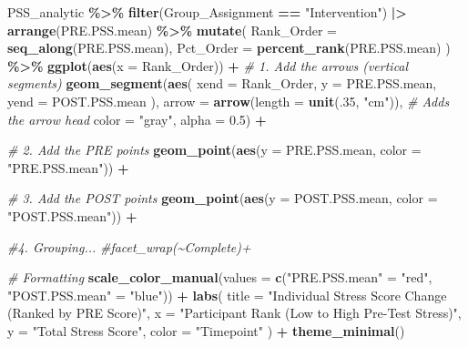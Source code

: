 \documentclass[
]{article}
\newenvironment{Shaded}{\begin{snugshade}}{\end{snugshade}}
\newcommand{\AttributeTok}[1]{\textcolor[rgb]{0.13,0.29,0.53}{#1}}
\newcommand{\CommentTok}[1]{\textcolor[rgb]{0.56,0.35,0.01}{\textit{#1}}}
\newcommand{\DecValTok}[1]{\textcolor[rgb]{0.00,0.00,0.81}{#1}}
\newcommand{\FloatTok}[1]{\textcolor[rgb]{0.00,0.00,0.81}{#1}}
\newcommand{\FunctionTok}[1]{\textcolor[rgb]{0.13,0.29,0.53}{\textbf{#1}}}
\newcommand{\NormalTok}[1]{#1}
\newcommand{\OtherTok}[1]{\textcolor[rgb]{0.56,0.35,0.01}{#1}}
\newcommand{\SpecialCharTok}[1]{\textcolor[rgb]{0.81,0.36,0.00}{\textbf{#1}}}
\newcommand{\StringTok}[1]{\textcolor[rgb]{0.31,0.60,0.02}{#1}}
\begin{document}
\begin{Shaded}
\begin{Highlighting}[]
\NormalTok{PSS\_analytic }\SpecialCharTok{\%\textgreater{}\%} 
  \FunctionTok{filter}\NormalTok{(Group\_Assignment }\SpecialCharTok{==} \StringTok{"Intervention"}\NormalTok{) }\SpecialCharTok{|\textgreater{}} 
  \FunctionTok{arrange}\NormalTok{(PRE.PSS.mean) }\SpecialCharTok{\%\textgreater{}\%} 
  \FunctionTok{mutate}\NormalTok{(}
    \AttributeTok{Rank\_Order =} \FunctionTok{seq\_along}\NormalTok{(PRE.PSS.mean),}
    \AttributeTok{Pct\_Order =} \FunctionTok{percent\_rank}\NormalTok{(PRE.PSS.mean)}
\NormalTok{  ) }\SpecialCharTok{\%\textgreater{}\%} 
  \FunctionTok{ggplot}\NormalTok{(}\FunctionTok{aes}\NormalTok{(}\AttributeTok{x =}\NormalTok{ Rank\_Order)) }\SpecialCharTok{+}
  \CommentTok{\# 1. Add the arrows (vertical segments)}
  \FunctionTok{geom\_segment}\NormalTok{(}\FunctionTok{aes}\NormalTok{(}
    \AttributeTok{xend =}\NormalTok{ Rank\_Order, }
    \AttributeTok{y =}\NormalTok{ PRE.PSS.mean, }
    \AttributeTok{yend =}\NormalTok{ POST.PSS.mean}
\NormalTok{  ), }
  \AttributeTok{arrow =} \FunctionTok{arrow}\NormalTok{(}\AttributeTok{length =} \FunctionTok{unit}\NormalTok{(.}\DecValTok{35}\NormalTok{, }\StringTok{"cm"}\NormalTok{)), }\CommentTok{\# Adds the arrow head}
  \AttributeTok{color =} \StringTok{"gray"}\NormalTok{, }
  \AttributeTok{alpha =} \FloatTok{0.5}\NormalTok{) }\SpecialCharTok{+}
  
  \CommentTok{\# 2. Add the PRE points}
  \FunctionTok{geom\_point}\NormalTok{(}\FunctionTok{aes}\NormalTok{(}\AttributeTok{y =}\NormalTok{ PRE.PSS.mean, }\AttributeTok{color =} \StringTok{"PRE.PSS.mean"}\NormalTok{)) }\SpecialCharTok{+}
  
  \CommentTok{\# 3. Add the POST points}
  \FunctionTok{geom\_point}\NormalTok{(}\FunctionTok{aes}\NormalTok{(}\AttributeTok{y =}\NormalTok{ POST.PSS.mean, }\AttributeTok{color =} \StringTok{"POST.PSS.mean"}\NormalTok{)) }\SpecialCharTok{+}
  
  \CommentTok{\#4. Grouping...}
  \CommentTok{\#facet\_wrap(\textasciitilde{}Complete)+}
  
  \CommentTok{\# Formatting}
  \FunctionTok{scale\_color\_manual}\NormalTok{(}\AttributeTok{values =} \FunctionTok{c}\NormalTok{(}\StringTok{"PRE.PSS.mean"} \OtherTok{=} \StringTok{"red"}\NormalTok{, }\StringTok{"POST.PSS.mean"} \OtherTok{=} \StringTok{"blue"}\NormalTok{)) }\SpecialCharTok{+}
  \FunctionTok{labs}\NormalTok{(}
    \AttributeTok{title =} \StringTok{"Individual Stress Score Change (Ranked by PRE Score)"}\NormalTok{,}
    \AttributeTok{x =} \StringTok{"Participant Rank (Low to High Pre{-}Test Stress)"}\NormalTok{,}
    \AttributeTok{y =} \StringTok{"Total Stress Score"}\NormalTok{,}
    \AttributeTok{color =} \StringTok{"Timepoint"}
\NormalTok{  ) }\SpecialCharTok{+}
  \FunctionTok{theme\_minimal}\NormalTok{()}
\end{Highlighting}
\end{Shaded}
\end{document}
